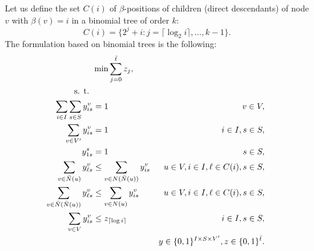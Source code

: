 Let us define the set $C(i)$ of $\beta$-positions of children (direct descendants) of node $v$ with $\beta(v)=i$ in a binomial tree of order $k$:
\begin{equation}
\label{eq:c1}
C(i)=\{2^j+i:j=\lceil\log_2 i\rceil,\dots,k-1\}.
\end{equation}
The formulation based on binomial trees is the following:
\begin{subequations}\label{mod:partition}
\begin{align}
\notag &\min\sum\limits_{j=0}^{\bar{t}}z_j,\\
\notag \text{s. t. } \\
\label{mod:part:nodeBelongs} \sum\limits_{i\in I}\sum\limits_{s\in S}y^v_{is} & = 1 & v\in V,\\
\label{mod:part:treeHasIJ} \sum\limits_{v\in V'}y^v_{is} & = 1 & i\in I,s\in S,\\
\label{mod:part:source1} y_{1s}^s & = 1  & s\in S,\\
\label{mod:part:followArcsA}\sum\limits_{v\in \bar{N}(u)}y^v_{\ell s}&\leq \sum\limits_{v\in N(\bar{N}(u))}y_{is}^{v} & u\in V,i\in I,\ell\in C(i), s\in S,  \\
\label{mod:part:followArcsB}\sum\limits_{v\in \bar{N}(\bar{N}(u))}y^v_{\ell s}&\leq \sum\limits_{v\in N(u)} y_{is}^{v} & u\in V,i\in I,\ell\in C(i), s\in S,\\
\label{mod:part:yzrel}\sum\limits_{v\in V}y^v_{is} & \leq z_{\lceil\log i\rceil} & i\in I,s\in S,\\
\label{mod:part:dim}&&y \in \{0,1\}^{I\times S\times V'}, z\in \{0,1\}^{\bar{t}}.
\end{align}~
\end{subequations}

